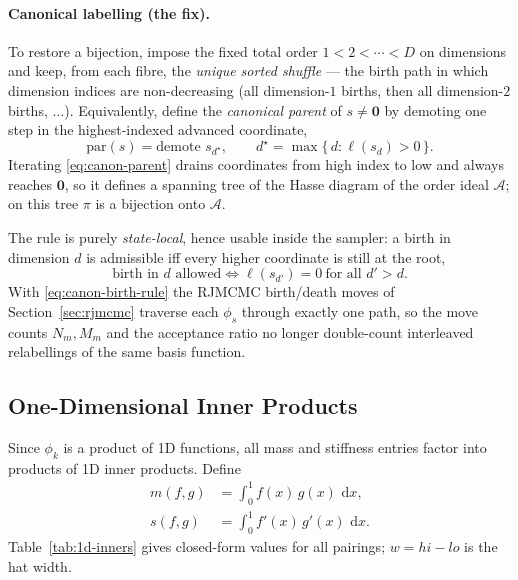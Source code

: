 \documentclass[11pt]{article}
\newcommand{\dd}{\,\mathrm{d}}
\begin{document}
\paragraph{Canonical labelling (the fix).}
To restore a bijection, impose the fixed total order $1<2<\cdots<D$ on
dimensions and keep, from each fibre, the \emph{unique sorted shuffle} --- the
birth path in which dimension indices are non-decreasing (all dimension-$1$
births, then all dimension-$2$ births, $\dots$).  Equivalently, define the
\emph{canonical parent} of $s\ne\mathbf 0$ by demoting one step in the
highest-indexed advanced coordinate,
\begin{equation}
  \mathrm{par}(s) = \text{demote } s_{d^\star},
  \qquad
  d^\star = \max\{\,d : \ell(s_d)>0\,\}.
  \label{eq:canon-parent}
\end{equation}
Iterating \eqref{eq:canon-parent} drains coordinates from high index to low and
always reaches $\mathbf 0$, so it defines a spanning tree of the Hasse diagram
of the order ideal $\mathcal{A}$; on this tree $\pi$ is a bijection onto
$\mathcal{A}$.

The rule is purely \emph{state-local}, hence usable inside the sampler: a birth
in dimension $d$ is admissible iff every higher coordinate is still at the root,
\begin{equation}
  \text{birth in } d \text{ allowed}
  \iff
  \ell(s_{d'}) = 0 \ \text{for all } d'>d.
  \label{eq:canon-birth-rule}
\end{equation}
With \eqref{eq:canon-birth-rule} the RJMCMC birth/death moves of
Section~\ref{sec:rjmcmc} traverse each $\phi_s$ through exactly one path, so the
move counts $N_m,M_m$ and the acceptance ratio no longer double-count
interleaved relabellings of the same basis function.

\subsection{One-Dimensional Inner Products}
\label{sec:1d-inners}

Since $\phi_k$ is a product of 1D functions, all mass and stiffness entries
factor into products of 1D inner products.  Define
\begin{align}
  m(f, g) &= \int_0^1 f(x)\,g(x)\,\dd x, \label{eq:mfg} \\
  s(f, g) &= \int_0^1 f'(x)\,g'(x)\,\dd x. \label{eq:sfg}
\end{align}
Table~\ref{tab:1d-inners} gives closed-form values for all pairings;
$w = hi-lo$ is the hat width.
\end{document}
